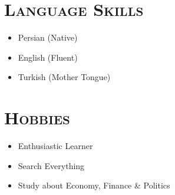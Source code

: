 \documentclass[line,margin]{res}
\begin{document}
\begin{resume}
\begin{spacing}{1.1}
\section{\textsc{Language Skills}}
\begin{itemize}
 \item Persian (Native)
\item English (Fluent)
\item Turkish (Mother Tongue)

\end{itemize}

\section{\textsc{Hobbies}}
\begin{itemize}
\item Enthusiastic Learner
\item Search Everything %
\item Study about Economy, Finance \& Politics
\end{itemize}

\end{spacing}
\end{resume}
\end{document}
